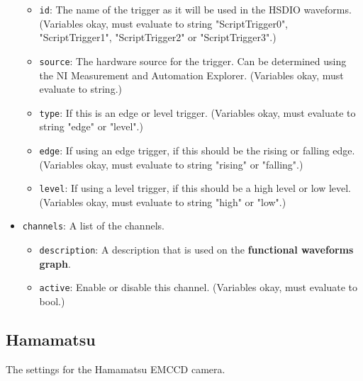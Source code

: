 \documentclass[pdftex,11pt,letterpaper]{article}
\begin{document}
\begin{itemize}
\begin{itemize}
\item \texttt{id}:  The name of the trigger as it will be used in the HSDIO waveforms.  (Variables okay, must evaluate to string "ScriptTrigger0", "ScriptTrigger1", "ScriptTrigger2" or "ScriptTrigger3".)
\item \texttt{source}:  The hardware source for the trigger.  Can be determined using the NI Measurement and Automation Explorer. (Variables okay, must evaluate to string.)
\item \texttt{type}:  If this is an edge or level trigger.  (Variables okay, must evaluate to string "edge" or "level".)
\item \texttt{edge}:  If using an edge trigger, if this should be the rising or falling edge.  (Variables okay, must evaluate to string "rising" or "falling".)
\item \texttt{level}:  If using a level trigger, if this should be a high level or low level.  (Variables okay, must evaluate to string "high" or "low".)
\end{itemize}
\item \texttt{channels}:  A list of the channels.
\begin{itemize}
\item \texttt{description}:  A description that is used on the \textbf{functional waveforms graph}.
\item \texttt{active}:  Enable or disable this channel.  (Variables okay, must evaluate to bool.)
\end{itemize}
\end{itemize}

\subsection{Hamamatsu}

The settings for the Hamamatsu EMCCD camera.
\end{document}
